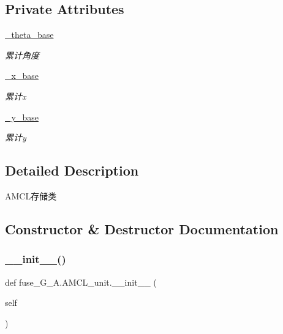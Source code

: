 \subsection*{Private Attributes}
\begin{DoxyCompactItemize}
\item 
\hyperlink{classfuse___g___a_1_1_a_m_c_l__unit_a336ad625626039ca8e590d3efe87651f}{\+\_\+theta\+\_\+base}
\begin{DoxyCompactList}\small\item\em 累计角度 \end{DoxyCompactList}\item 
\hyperlink{classfuse___g___a_1_1_a_m_c_l__unit_a674f2f89f1f1524cc255fefea7219931}{\+\_\+x\+\_\+base}
\begin{DoxyCompactList}\small\item\em 累计x \end{DoxyCompactList}\item 
\hyperlink{classfuse___g___a_1_1_a_m_c_l__unit_a1c9b2417d2fef9e4733b17d3f8c3b608}{\+\_\+y\+\_\+base}
\begin{DoxyCompactList}\small\item\em 累计y \end{DoxyCompactList}\end{DoxyCompactItemize}


\subsection{Detailed Description}
A\+M\+C\+L存储类 



\subsection{Constructor \& Destructor Documentation}
\mbox{\label{classfuse___g___a_1_1_a_m_c_l__unit_a649b220b24560e61c889c00692062ecf}} 
\subsubsection{\texorpdfstring{\+\_\+\+\_\+init\+\_\+\+\_\+()}{\_\_init\_\_()}}
{\footnotesize\ttfamily def fuse\+\_\+\+G\+\_\+\+A.\+A\+M\+C\+L\+\_\+unit.\+\_\+\+\_\+init\+\_\+\+\_\+ (\begin{DoxyParamCaption}\item[{}]{self }\end{DoxyParamCaption})}



